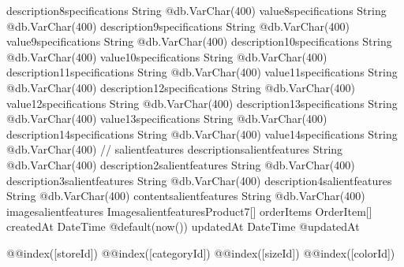 {  description8specifications   String                         @db.VarChar(400)
  value8specifications         String                         @db.VarChar(400)
  description9specifications   String                         @db.VarChar(400)
  value9specifications         String                         @db.VarChar(400)
  description10specifications  String                         @db.VarChar(400)
  value10specifications        String                         @db.VarChar(400)
  description11specifications  String                         @db.VarChar(400)
  value11specifications        String                         @db.VarChar(400)
  description12specifications  String                         @db.VarChar(400)
  value12specifications        String                         @db.VarChar(400)
  description13specifications  String                         @db.VarChar(400)
  value13specifications        String                         @db.VarChar(400)
  description14specifications  String                         @db.VarChar(400)
  value14specifications        String                         @db.VarChar(400)
  // salientfeatures
  descriptionsalientfeatures   String                         @db.VarChar(400)
  description2salientfeatures  String                         @db.VarChar(400)
  description3salientfeatures  String                         @db.VarChar(400)
  description4salientfeatures  String                         @db.VarChar(400)
  contentsalientfeatures       String                         @db.VarChar(400)
  imagesalientfeatures ImagesalientfeaturesProduct7[]
  orderItems                   OrderItem[]
  createdAt                    DateTime                       @default(now())
  updatedAt                    DateTime                       @updatedAt

  @@index([storeId])
  @@index([categoryId])
  @@index([sizeId])
  @@index([colorId])
}

